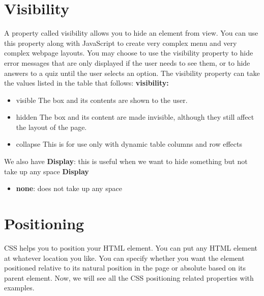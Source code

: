 \documentclass{report}
\begin{document}
    \section{\LARGE Visibility}
    \bigbreak \noindent 
    A property called visibility allows you to hide an element from view. You can use
    this property along with JavaScript to create very complex menu and very
    complex webpage layouts.
    \bigbreak \noindent 
    You may choose to use the visibility property to hide error messages that are
    only displayed if the user needs to see them, or to hide answers to a quiz until
    the user selects an option.
    \bigbreak \noindent 
    The visibility property can take the values listed in the table that follows:
    \bigbreak \noindent 
    \textbf{visibility:}
    \begin{itemize}
        \item visible The box and its contents are shown to the user.
        \item hidden The box and its content are made invisible, although they still affect the layout of the page.
        \item collapse This is for use only with dynamic table columns and row effects
    \end{itemize}
    \bigbreak \noindent 
    We also have \textbf{Display}: this is useful when we want to hide something but not take up any space
    \bigbreak \noindent 
    \textbf{Display}
    \begin{itemize}
        \item \textbf{none}: does not take up any space
    \end{itemize}


    \bigbreak \noindent 
    \section{\LARGE Positioning}
    \bigbreak \noindent 
    CSS helps you to position your HTML element. You can put any HTML element at
whatever location you like. You can specify whether you want the element
positioned relative to its natural position in the page or absolute based on its
parent element.
\bigbreak \noindent 
Now, we will see all the CSS positioning related properties with examples.

    \bigbreak \noindent 
\end{document}
